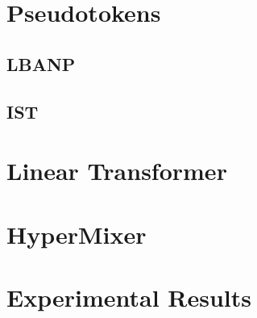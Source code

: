 \documentclass[../../main.tex]{subfiles}
\begin{document}
\section{Pseudotokens}

\subsection{LBANP}

\subsection{IST}

\section{Linear Transformer}

\section{HyperMixer}

\section{Experimental Results}



\ifSubfilesClassLoaded{%
    \printbibliography{}
}{} 
\end{document}

